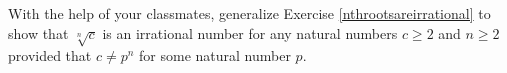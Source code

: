 {With the help of your classmates, generalize Exercise \ref{nthrootsareirrational} to show that $\sqrt[n]{c}$ is an irrational number for any natural numbers $c \geq 2$ and $n \geq 2$ provided that $c \neq p^{n}$ for some natural number $p$.}
{}